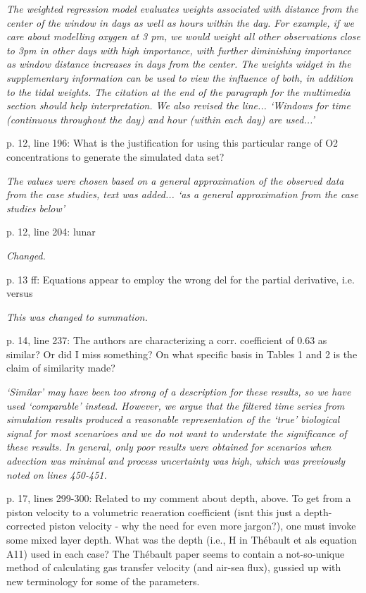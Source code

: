 \documentclass[letterpaper,12pt]{article}\usepackage[]{graphicx}\usepackage[]{color}
\begin{document}
{\it The weighted regression model evaluates weights associated with distance from the center of the window in days as well as hours within the day.  For example, if we care about modelling oxygen at 3 pm, we would weight all other observations close to 3pm in other days with high importance, with further diminishing importance as window distance increases in days from the center.  The weights widget in the supplementary information can be used to view the influence of both, in addition to the tidal weights.  The citation at the end of the paragraph for the multimedia section should help interpretation.  We also revised the line... `Windows for time (continuous throughout the day) and hour (within each day) are used...'
}

p. 12, line 196: What is the justification for using this particular range of O2 concentrations to generate the simulated data set?

{\it The values were chosen based on a general approximation of the observed data from the case studies, text was added... `as a general approximation from the case studies below'}

p. 12, line 204: lunar

{\it Changed.}

p. 13 ff: Equations appear to employ the wrong del for the partial derivative, i.e. versus

{\it This was changed to summation.}

p. 14, line 237: The authors are characterizing a corr. coefficient of 0.63 as similar? Or did I
miss something? On what specific basis in Tables 1 and 2 is the claim of similarity made?

{\it `Similar' may have been too strong of a description for these results, so we have used `comparable' instead.  However, we argue that the filtered time series from simulation results produced a reasonable representation of the `true' biological signal for most scenarioes and we do not want to understate the significance of these results.  In general, only poor results were obtained for scenarios when advection was minimal and process uncertainty was high, which was previously noted on lines 450-451.}

p. 17, lines 299-300: Related to my comment about depth, above. To get from a piston velocity
to a volumetric reaeration coefficient (isnt this just a depth-corrected piston velocity - why the need for even more jargon?), one must invoke some mixed layer depth. What was the depth (i.e., H in Thébault et als equation A11) used in each case? The Thébault paper seems to contain a not-so-unique method of calculating gas transfer velocity (and air-sea flux), gussied up with new terminology for some of the parameters.
\end{document}
